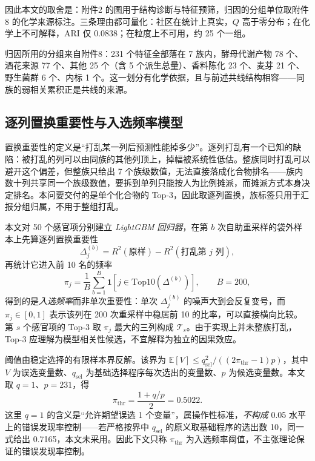 因此本文的取舍是：附件2 的图用于结构诊断与特征预筛，归因的分组单位取附件8 的化学来源标注。三条理由都可量化：社区在统计上真实，$Q$ 高于零分布；在化学上不可解释，ARI 仅 0.0838；在粒度上不可用，约 25 个一组。

归因所用的分组来自附件8：231 个特征全部落在 7 族内，酵母代谢产物 78 个、酒花来源 77 个、其他 25 个（含 5 个派生总量）、香料陈化 23 个、麦芽 21 个、野生菌群 6 个、内标 1 个。这一划分有化学依据，且与前述共线结构相容——同族的弱相关累积正是共线的来源。

\subsection{逐列置换重要性与入选频率模型}

置换重要性的定义是“打乱某一列后预测性能掉多少”。逐列打乱有一个已知的缺陷：被打乱的列可以由同族的其他列顶上，掉幅被系统性低估\cite{strobl2008}。整族同时打乱可以避开这个偏差，但整族只给出 7 个族级数值，无法直接落成化合物排名——族内数十列共享同一个族级数值，要拆到单列只能按人为比例摊派，而摊派方式本身决定排名。本问要交付的是单个化合物的 Top-3，因此取逐列置换，族标签只用于汇报分组归属，不用于整组打乱。

本文对 50 个感官项分别建立 \emph{LightGBM 回归器}，在第 $b$ 次自助重采样的袋外样本上先算逐列置换重要性
\begin{equation}
  \Delta^{(b)}_{j}=R^{2}\left(\text{原样}\right)-R^{2}\left(\text{打乱第 }j\text{ 列}\right),
\end{equation}
再统计它进入前 10 名的频率
\begin{equation}
  \pi_{j}=\frac{1}{B}\sum_{b=1}^{B}\mathbf{1}\left[j\in\mathrm{Top10}\left(\Delta^{(b)}\right)\right],
  \qquad B=200,
\end{equation}
得到的是\emph{入选频率}而非单次重要性：单次 $\Delta^{(b)}_{j}$ 的噪声大到会反复变号，而 $\pi_j\in[0,1]$ 表示该列在 200 次重采样中稳居前 10 的比率，可以直接横向比较。第 $s$ 个感官项的 Top-3 取 $\pi_j$ 最大的三列构成 $\mathcal{T}_s$。由于实现上并未整族打乱，Top-3 应理解为模型相关性候选，不宜解释为独立的因果效应。

阈值由稳定选择的有限样本界反解。该界为 $\mathbb{E}[V]\le q_{\mathrm{sel}}^{2}/\left((2\pi_{\mathrm{thr}}-1)p\right)$，其中 $V$ 为误选变量数、$q_{\mathrm{sel}}$ 为基础选择程序每次选出的变量数、$p$ 为候选变量数。本文取 $q=1$、$p=231$，得
\begin{equation}
  \pi_{\mathrm{thr}}=\frac{1+q/p}{2}=0.5022 .
\end{equation}
这里 $q=1$ 的含义是“允许期望误选 1 个变量”，属操作性标准，\emph{不构成} 0.05 水平上的错误发现率控制——若严格按界中 $q_{\mathrm{sel}}$ 的原义取基础程序的选出数 10，同一式给出 0.7165，本文未采用。因此下文只称 $\pi_{\mathrm{thr}}$ 为入选频率阈值，不主张理论保证的错误发现率控制。

